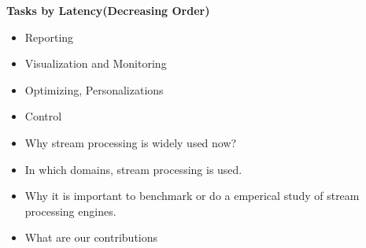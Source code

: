 \documentclass{sig-alternate}
\begin{document}
\textbf{Tasks by Latency(Decreasing Order)}
\begin{itemize}
 \item Reporting
 \item Visualization and Monitoring
 \item Optimizing, Personalizations
 \item Control
\end{itemize}


\begin{itemize}

  \item Why stream processing is widely used now?
  \item In which domains, stream processing is used.
  \item Why it is important to benchmark or do a emperical study of
    stream processing engines.
  \item What are our contributions
\end{itemize}



\end{document}
